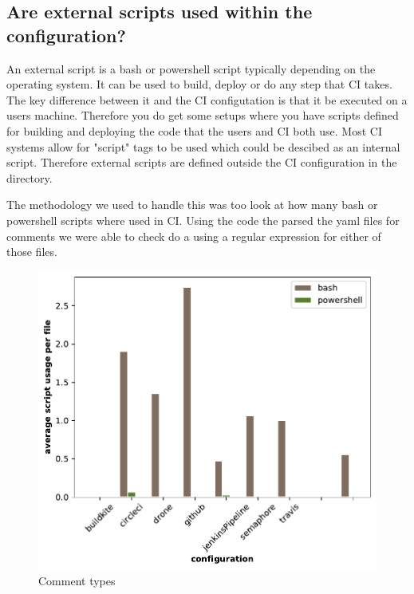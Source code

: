 \documentclass[twoside,12pt,titlepage,a4paper]{article}
\begin{document}
\pagebreak

\vspace*{-0.05in}
\subsection{Are external scripts used within the configuration?}
\vspace*{-0.05in}

An external script is a bash or powershell script typically depending on the operating system. It can be used to build, deploy or do any step that CI takes. The key difference between it and the CI configutation is that it be executed on a users machine. Therefore you do get some setups where you have scripts defined for building and deploying the code that the users and CI both use. Most CI systems allow for "script" tags to be used which could be descibed as an internal script. Therefore external scripts are defined outside the CI configuration in the directory.

The methodology we used to handle this was too look at how many bash or powershell scripts where used in CI. Using the code the parsed the yaml files for comments we were able to check do a using a regular expression for either of those files.  


\begin{figure}[!ht]
  \centering
  \begin{minipage}[!t]{.48\textwidth}
      \includegraphics[width=\textwidth]{../src/results/scripts usage bars.pdf}
      \caption[alt text]{Comment types}
      \label{fig:script_usage}  
  \end{minipage}%
  \hfill
  \begin{minipage}[!t]{.48\textwidth}
    
  \end{minipage}
\end{figure}
\end{document}
